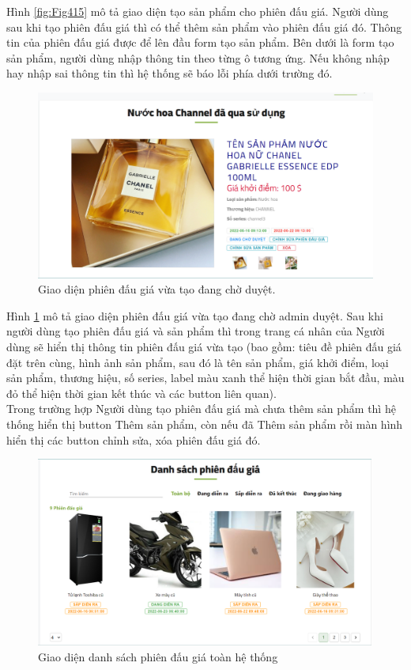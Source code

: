\documentclass[../DoAn.tex]{subfiles}
\begin{document}
Hình \ref{fig:Fig415} mô tả giao diện tạo sản phẩm cho phiên đấu giá. Người dùng sau khi tạo phiên đấu giá thì có thể thêm sản phẩm vào phiên đấu giá đó. Thông tin của phiên đấu giá được để lên đầu form tạo sản phẩm. Bên dưới là form tạo sản phẩm, người dùng nhập thông tin theo từng ô tương ứng. Nếu không nhập hay nhập sai thông tin thì hệ thống sẽ báo lỗi phía dưới trường đó.
\begin{figure}[H]
    \centering
    \includegraphics[width=0.75\linewidth,height=6.21cm]{Hinhve/auctionwait.png}
    \caption{Giao diện phiên đấu giá vừa tạo đang chờ duyệt.}
    \label{fig:Fig416}
\end{figure}
Hình \ref{fig:Fig416} mô tả giao diện phiên đấu giá vừa tạo đang chờ admin duyệt. Sau khi người dùng tạo phiên đấu giá và sản phẩm thì trong trang cá nhân của Người dùng sẽ hiển thị thông tin phiên đấu giá vừa tạo (bao gồm: tiêu đề phiên đấu giá đặt trên cùng, hình ảnh sản phẩm, sau đó là tên sản phẩm, giá khởi điểm, loại sản phẩm, thương hiệu, số series, label màu xanh thể hiện thời gian bắt đầu, màu đỏ thể hiện thời gian kết thúc và các button liên quan).\\
Trong trường hợp Người dùng tạo phiên đấu giá mà chưa thêm sản phẩm thì hệ thống hiển thị button Thêm sản phẩm, còn nếu đã Thêm sản phẩm rồi màn hình hiển thị các button chỉnh sửa, xóa phiên đấu giá đó. 
\begin{figure}[H]
    \centering
    \includegraphics[width=0.75\linewidth,height=6.24cm]{Hinhve/listauctions.png}
    \caption{Giao diện danh sách phiên đấu giá toàn hệ thống}
    \label{fig:Fig417}
\end{figure}
\end{document}
